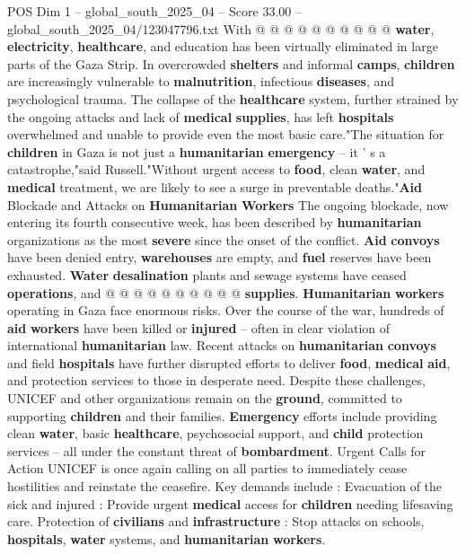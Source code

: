 \begin{textsample}{POS Dim 1 – global\_south\_2025\_04 – Score 33.00 – global\_south\_2025\_04/123047796.txt}
With @ @ @ @ @ @ @ @ @ @ \textbf{water}, \textbf{electricity}, \textbf{healthcare}, and education has been virtually eliminated in large parts of the Gaza Strip.
In overcrowded \textbf{shelters} and informal \textbf{camps}, \textbf{children} are increasingly vulnerable to \textbf{malnutrition}, infectious \textbf{diseases}, and psychological trauma.
The collapse of the \textbf{healthcare} system, further strained by the ongoing attacks and lack of \textbf{medical} \textbf{supplies}, has left \textbf{hospitals} overwhelmed and unable to provide even the most basic care."The situation for \textbf{children} in Gaza is not just a \textbf{humanitarian} \textbf{emergency} -- it ' s a catastrophe,"said Russell."Without urgent access to \textbf{food}, clean \textbf{water}, and \textbf{medical} treatment, we are likely to see a surge in preventable deaths."\textbf{Aid} Blockade and Attacks on \textbf{Humanitarian} \textbf{Workers} The ongoing blockade, now entering its fourth consecutive week, has been described by \textbf{humanitarian} organizations as the most \textbf{severe} since the onset of the conflict. \textbf{Aid} \textbf{convoys} have been denied entry, \textbf{warehouses} are empty, and \textbf{fuel} reserves have been exhausted. \textbf{Water} \textbf{desalination} plants and sewage systems have ceased \textbf{operations}, and @ @ @ @ @ @ @ @ @ @ \textbf{supplies}. \textbf{Humanitarian} \textbf{workers} operating in Gaza face enormous risks.
Over the course of the war, hundreds of \textbf{aid} \textbf{workers} have been killed or \textbf{injured} -- often in clear violation of international \textbf{humanitarian} law.
Recent attacks on \textbf{humanitarian} \textbf{convoys} and field \textbf{hospitals} have further disrupted efforts to deliver \textbf{food}, \textbf{medical} \textbf{aid}, and protection services to those in desperate need.
Despite these challenges, UNICEF and other organizations remain on the \textbf{ground}, committed to supporting \textbf{children} and their families. \textbf{Emergency} efforts include providing clean \textbf{water}, basic \textbf{healthcare}, psychosocial support, and \textbf{child} protection services -- all under the constant threat of \textbf{bombardment}.
Urgent Calls for Action UNICEF is once again calling on all parties to immediately cease hostilities and reinstate the ceasefire.
Key demands include : Evacuation of the sick and injured : Provide urgent \textbf{medical} access for \textbf{children} needing lifesaving care.
Protection of \textbf{civilians} and \textbf{infrastructure} : Stop attacks on schools, \textbf{hospitals}, \textbf{water} systems, and \textbf{humanitarian} \textbf{workers}.

\end{textsample}
